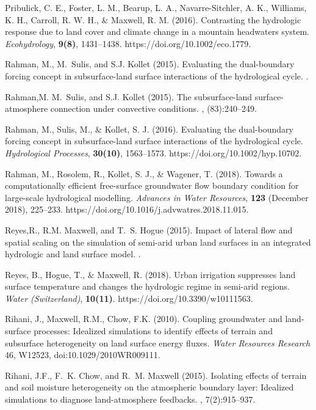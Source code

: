 \begin{thebibliography}{999}
Pribulick, C. E., Foster, L. M., Bearup, L. A., Navarre-Sitchler, A. K., Williams, K. H., Carroll, R. W. H., \& Maxwell, R. M. (2016). Contrasting the hydrologic response due to land cover and climate change in a mountain headwaters system. {\em Ecohydrology}, {\bf 9(8)}, 1431–1438. https://doi.org/10.1002/eco.1779.


Rahman, M., M.~Sulis, and S.J. Kollet (2015).
\newblock Evaluating the dual-boundary forcing concept in subsurface-land
  surface interactions of the hydrological cycle.
.

Rahman,M. M.~Sulis, and S.J. Kollet (2015).
\newblock The subsurface-land surface-atmosphere connection under convective
  conditions.
, (83):240--249.

Rahman, M., Sulis, M., \& Kollet, S. J. (2016). Evaluating the dual-boundary forcing concept in subsurface-land surface interactions of the hydrological cycle. {\em Hydrological Processes}, {\bf 30(10)}, 1563–1573. https://doi.org/10.1002/hyp.10702.

Rahman, M., Rosolem, R., Kollet, S. J., \& Wagener, T. (2018). Towards a computationally efficient free-surface groundwater flow boundary condition for large-scale hydrological modelling. {\em Advances in Water Resources}, {\bf 123} (December 2018), 225–233. https://doi.org/10.1016/j.advwatres.2018.11.015.

Reyes,R., R.M. Maxwell, and T.~S. Hogue (2015).
\newblock Impact of lateral flow and spatial scaling on the simulation of
  semi-arid urban land surfaces in an integrated hydrologic and land surface
  model.
.

Reyes, B., Hogue, T., \& Maxwell, R. (2018). Urban irrigation suppresses land surface temperature and changes the hydrologic regime in semi-arid regions. {\em Water (Switzerland)}, {\bf 10(11)}. https://doi.org/10.3390/w10111563.


Rihani, J., Maxwell, R.M., Chow, F.K. (2010). Coupling groundwater and land-surface processes: Idealized simulations to identify effects of terrain and subsurface heterogeneity on land surface energy fluxes. {\em Water Resources Research} 46, W12523, doi:10.1029/2010WR009111.


Rihani, J.F., F.~K. Chow, and R.~M. Maxwell (2015).
\newblock Isolating effects of terrain and soil moisture heterogeneity on the
  atmospheric boundary layer: Idealized simulations to diagnose land-atmosphere
  feedbacks.
, 7(2):915--937.


\end{thebibliography}
